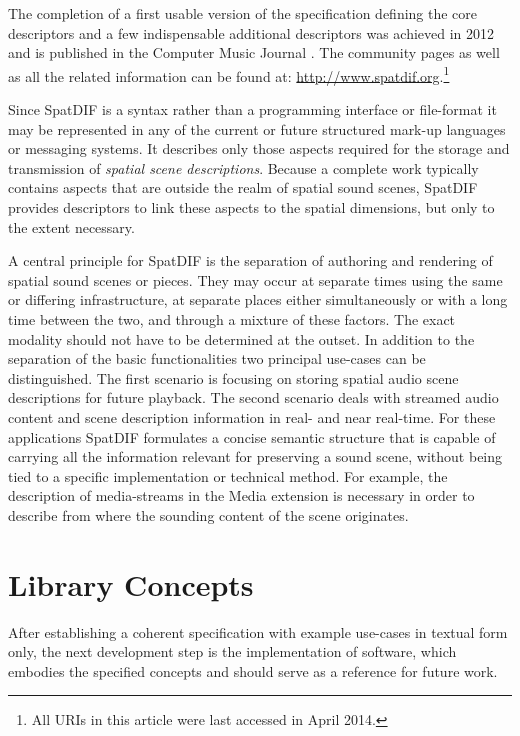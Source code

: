 \documentclass{article}
\begin{document}
The completion of a first usable version of the specification \cite{SpatDIF_03} defining the core descriptors and a few indispensable additional descriptors was achieved in 2012 and is published in the Computer Music Journal \cite{Peters:2013SpatDifCMJ}.
The community pages as well as all the related information can be found at: \url{http://www.spatdif.org}.\footnote{All URIs in this article were last accessed in April 2014.}

Since SpatDIF is a syntax rather than a programming interface or file-format it may be represented in any of the current or future structured mark-up languages or messaging systems.
It describes only those aspects required for the storage and transmission of \emph{spatial scene descriptions}.
Because a complete work typically contains aspects that are outside the realm of spatial sound scenes, SpatDIF provides descriptors to link these aspects to the spatial dimensions, but only to the extent necessary.

A central principle for SpatDIF is the separation of authoring and rendering of spatial sound scenes or pieces.
They may occur at separate times using the same or differing infrastructure, at separate places either simultaneously or with a long time between the two, and through a mixture of these factors. 
The exact modality should not have to be determined at the outset.
In addition to the separation of the basic functionalities two principal use-cases can be distinguished.
The first scenario is focusing on storing spatial audio scene descriptions for future playback. 
The second scenario deals with streamed audio content and scene description information in real- and near real-time.
For these applications SpatDIF formulates a concise semantic structure that is capable of carrying all the information relevant for preserving a sound scene, without being tied to a specific implementation or technical method.
For example, the description of media-streams in the Media extension is necessary in order to describe from where the sounding content of the scene originates.

\section{Library Concepts}\label{sec:libspatdif_concepts}

After establishing a coherent specification with example use-cases in textual form only, the next development step is the implementation of software, which embodies the specified concepts and should serve as a reference for future work.
\end{document}
